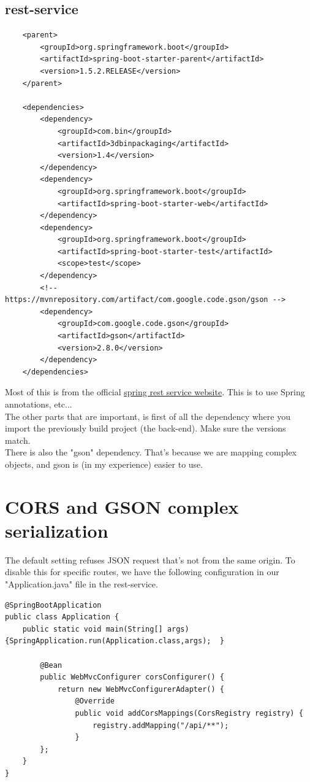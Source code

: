 \documentclass[a4paper,12pt]{article}
\begin{document}
\subsection{rest-service}
\begin{lstlisting}
	<parent>
		<groupId>org.springframework.boot</groupId>
		<artifactId>spring-boot-starter-parent</artifactId>
		<version>1.5.2.RELEASE</version>
	</parent>
	
	<dependencies>
		<dependency>
			<groupId>com.bin</groupId>
			<artifactId>3dbinpackaging</artifactId>
			<version>1.4</version>
		</dependency>
		<dependency>
			<groupId>org.springframework.boot</groupId>
			<artifactId>spring-boot-starter-web</artifactId>
		</dependency>
		<dependency>
			<groupId>org.springframework.boot</groupId>
			<artifactId>spring-boot-starter-test</artifactId>
			<scope>test</scope>
		</dependency>
		<!-- https://mvnrepository.com/artifact/com.google.code.gson/gson -->
		<dependency>
			<groupId>com.google.code.gson</groupId>
			<artifactId>gson</artifactId>
			<version>2.8.0</version>
		</dependency>
	</dependencies>
\end{lstlisting}
Most of this is from the official \hyperref{https://spring.io/guides/gs/rest-service/}{}{}{spring rest service website}. This is to use Spring annotations, etc... \\

The other parts that are important, is first of all the dependency where you import the previously build project (the back-end). Make sure the versions match. \\

There is also the "gson" dependency. That's because we are mapping complex objects, and gson is (in my experience) easier to use. 

\pagebreak
\section{CORS and GSON complex serialization}
The default setting refuses JSON request that's not from the same origin. To disable this for specific routes, we have the following configuration in our "Application.java" file in the rest-service.

\lstset{language=Java}
\begin{lstlisting}
@SpringBootApplication
public class Application {
	public static void main(String[] args) {SpringApplication.run(Application.class,args);	}
		
		@Bean
		public WebMvcConfigurer corsConfigurer() {
			return new WebMvcConfigurerAdapter() {
				@Override
				public void addCorsMappings(CorsRegistry registry) {
					registry.addMapping("/api/**");
				}
		};
	}
}
\end{lstlisting}
\end{document}
